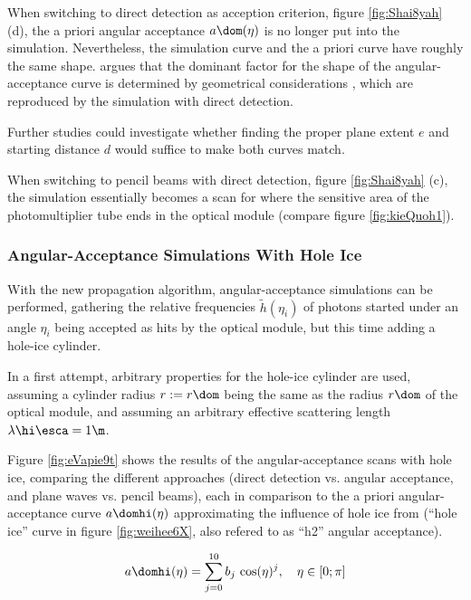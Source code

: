 When switching to direct detection as acception criterion, figure \ref{fig:Shai8yah} (d), the a priori angular acceptance $a\dom(\eta)$ is no longer put into the simulation. Nevertheless, the simulation curve and the a priori curve have roughly the same shape.  argues that the dominant factor for the shape of the angular-acceptance curve is determined by geometrical considerations \cite{martindardupdate}, which are reproduced by the simulation with direct detection.

Further studies could investigate whether finding the proper plane extent $e$ and starting distance $d$ would suffice to make both curves match.\followup

When switching to pencil beams with direct detection, figure \ref{fig:Shai8yah} (c), the simulation essentially becomes a scan for where the sensitive area of the photomultiplier tube ends in the optical module (compare figure \ref{fig:kieQuoh1}).


\subsubsection{Angular-Acceptance Simulations With Hole Ice}
\label{sec:angular_acceptance_simulations_with_hole_ice}\label{sec:hole_ice_approximation}
With the new propagation algorithm, angular-acceptance simulations can be performed, gathering the relative frequencies $\tilde{h}(\eta_i)$ of photons started under an angle $\eta_i$ being accepted as hits by the optical module, but this time adding a hole-ice cylinder.

In a first attempt, arbitrary properties for the hole-ice cylinder are used, assuming a cylinder radius $r:=r\dom$ being the same as the radius $r\dom$ of the optical module, and assuming an arbitrary effective scattering length $\lambda\hi\esca = 1\m$.


Figure \ref{fig:eVapie9t} shows the results of the angular-acceptance scans with hole ice, comparing the different approaches (direct detection vs. angular acceptance, and plane waves vs. pencil beams), each in comparison to the a priori angular-acceptance curve $a\domhi(\eta)$ approximating the influence of hole ice from \cite{icepaper} (\enquote{hole ice} curve in figure \ref{fig:weihee6X}, also refered to as \enquote{h2} angular acceptance).

\begin{equation}
  a\domhi(\eta) = \sum_{j = 0}^{10} b_j\,\cos(\eta)^j, \ \ \ \eta \in [0; \pi]
  \label{eq:aholeice}
\end{equation}

